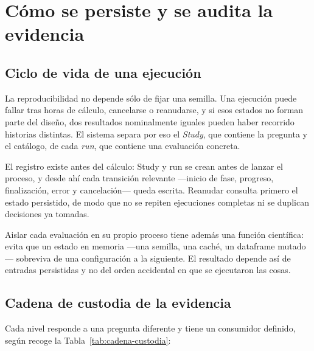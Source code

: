 \section{Cómo se persiste y se audita la evidencia}

\subsection{Ciclo de vida de una ejecución}

La reproducibilidad no depende sólo de fijar una semilla. Una ejecución puede fallar tras horas de
cálculo, cancelarse o reanudarse, y si esos estados no forman parte del diseño, dos resultados
nominalmente iguales pueden haber recorrido historias distintas. El sistema separa por eso el
\emph{Study}, que contiene la pregunta y el catálogo, de cada \emph{run}, que contiene una
evaluación concreta.

El registro existe antes del cálculo: Study y run se crean antes de lanzar el proceso, y desde ahí
cada transición relevante ---inicio de fase, progreso, finalización, error y cancelación--- queda
escrita. Reanudar consulta primero el estado persistido, de modo que no se repiten ejecuciones
completas ni se duplican decisiones ya tomadas.

Aislar cada evaluación en su propio proceso tiene además una función científica: evita que un estado
en memoria ---una semilla, una caché, un dataframe mutado--- sobreviva de una configuración a la
siguiente. El resultado depende así de entradas persistidas y no del orden accidental en que se
ejecutaron las cosas.

\subsection{Cadena de custodia de la evidencia}

Cada nivel responde a una pregunta diferente y tiene un consumidor definido, según recoge la
Tabla~\ref{tab:cadena-custodia}:

